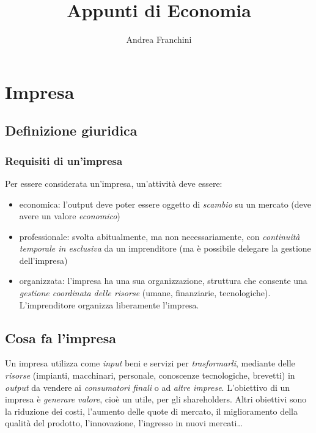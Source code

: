 \documentclass[10pt,a4paper,fleqn,oneside]{book}
\title{Appunti di Economia}
\author{Andrea Franchini}
\begin{document}
\maketitle

\tableofcontents

\chapter{Impresa}

\section{Definizione giuridica}

\subsection{Requisiti di un'impresa}
Per essere considerata un'\gls{impresa}, un'attività deve essere:
\begin{itemize}
    \item economica: l’output deve poter essere oggetto di \emph{scambio} su un 
    mercato (deve avere un valore \emph{economico})
    \item professionale: svolta abitualmente, ma non necessariamente, con
    \emph{continuità temporale in esclusiva} da un \gls{imprenditore} (ma è
    possibile delegare la gestione dell’\gls{impresa})
    \item organizzata: l’impresa ha una sua organizzazione, struttura che
    consente una \emph{gestione coordinata delle risorse} (umane, finanziarie,
    tecnologiche). L’imprenditore organizza liberamente l’impresa.
\end{itemize}

\section{Cosa fa l'impresa}

Un impresa utilizza come \emph{input} beni e servizi per \emph{trasformarli},
mediante delle \emph{risorse} (impianti, macchinari, personale, conoscenze
tecnologiche, brevetti) in \emph{output} da vendere ai \emph{consumatori finali}
o ad \emph{altre imprese}. L'obiettivo di un impresa è \emph{generare valore},
cioè un \gls{utile}, per gli \glspl{shareholder}. Altri obiettivi sono la
riduzione dei costi, l'aumento delle quote di mercato, il miglioramento della
qualità del prodotto, l'innovazione, l'ingresso in nuovi mercati\dots
\end{document}
